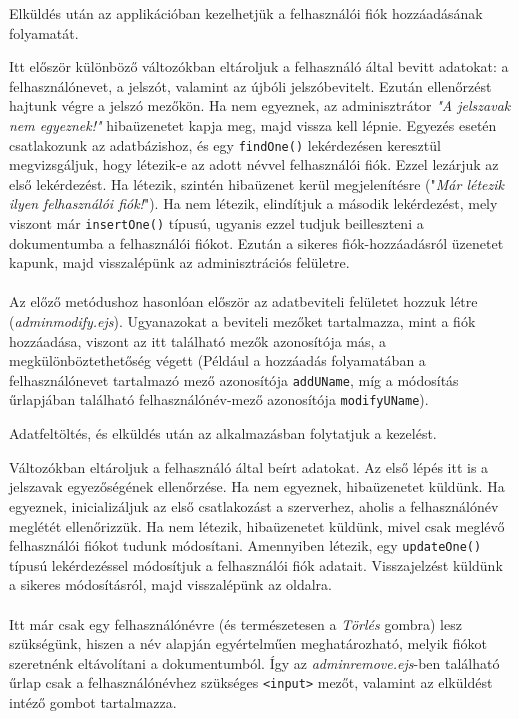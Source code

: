 Elküldés után az applikációban kezelhetjük a felhasználói fiók hozzáadásának folyamatát.

Itt először különböző változókban eltároljuk a felhasználó által bevitt adatokat: a felhasználónevet, a jelszót, valamint az újbóli jelszóbevitelt. Ezután ellenőrzést hajtunk végre a jelszó mezőkön. Ha nem egyeznek, az adminisztrátor \textit{"A jelszavak nem egyeznek!"} hibaüzenetet kapja meg, majd vissza kell lépnie. Egyezés esetén csatlakozunk az adatbázishoz, és egy \texttt{findOne()} lekérdezésen keresztül megvizsgáljuk, hogy létezik-e az adott névvel felhasználói fiók. Ezzel lezárjuk az első lekérdezést. Ha létezik, szintén hibaüzenet kerül megjelenítésre ("\textit{Már létezik ilyen felhasználói fiók!}"). Ha nem létezik, elindítjuk a második lekérdezést, mely viszont már \texttt{insertOne()} típusú, ugyanis ezzel tudjuk beilleszteni a dokumentumba a felhasználói fiókot. Ezután a sikeres fiók-hozzáadásról üzenetet kapunk, majd visszalépünk az adminisztrációs felületre.\\

\\

Az előző metódushoz hasonlóan először az adatbeviteli felületet hozzuk létre (\textit{adminmodify.ejs}). Ugyanazokat a beviteli mezőket tartalmazza, mint a fiók hozzáadása, viszont az itt található mezők azonosítója más, a megkülönböztethetőség végett (Például a hozzáadás folyamatában a felhasználónevet tartalmazó mező azonosítója \texttt{addUName}, míg a módosítás űrlapjában található felhasználónév-mező azonosítója \texttt{modifyUName}).

Adatfeltöltés, és elküldés után az alkalmazásban folytatjuk a kezelést.

Változókban eltároljuk a felhasználó által beírt adatokat. Az első lépés itt is a jelszavak egyezőségének ellenőrzése. Ha nem egyeznek, hibaüzenetet küldünk. Ha egyeznek, inicializáljuk az első csatlakozást a szerverhez, aholis a felhasználónév meglétét ellenőrizzük. Ha nem létezik, hibaüzenetet küldünk, mivel csak meglévő felhasználói fiókot tudunk módosítani. Amennyiben létezik, egy \texttt{updateOne()} típusú lekérdezéssel módosítjuk a felhasználói fiók adatait. Visszajelzést küldünk a sikeres módosításról, majd visszalépünk az oldalra.\\

\\

Itt már csak egy felhasználónévre (és természetesen a \textit{Törlés} gombra) lesz szükségünk, hiszen a név alapján egyértelműen meghatározható, melyik fiókot szeretnénk eltávolítani a dokumentumból. Így az \textit{adminremove.ejs}-ben található űrlap csak a felhasználónévhez szükséges \texttt{<input>} mezőt, valamint az elküldést intéző gombot tartalmazza.

